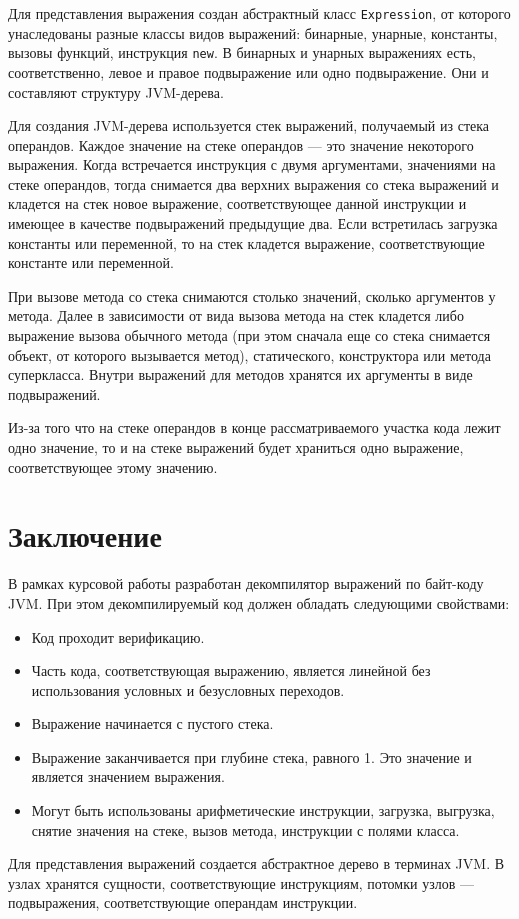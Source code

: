 Для представления выражения создан абстрактный класс \texttt{Expression}, от которого унаследованы разные классы видов выражений: бинарные, унарные, константы, вызовы функций, инструкция \texttt{new}. В бинарных и унарных выражениях есть, соответственно, левое и правое подвыражение или одно подвыражение. Они и составляют структуру JVM-дерева.

Для создания JVM-дерева используется стек выражений, получаемый из стека операндов. Каждое значение на стеке операндов --- это значение некоторого выражения. Когда встречается инструкция с двумя аргументами, значениями на стеке операндов, тогда снимается два верхних выражения со стека выражений и кладется на стек новое выражение, соответствующее данной инструкции и имеющее в качестве подвыражений предыдущие два. Если встретилась загрузка константы или переменной, то на стек кладется выражение, соответствующие константе или переменной. 

При вызове метода со стека снимаются столько значений, сколько аргументов у метода. Далее в зависимости от вида вызова метода на стек кладется либо выражение вызова обычного метода (при этом сначала еще со стека снимается объект, от которого вызывается метод), статического, конструктора или метода суперкласса. Внутри выражений для методов хранятся их аргументы в виде подвыражений.

Из-за того что на стеке операндов в конце рассматриваемого участка кода лежит одно значение, то и на стеке выражений будет храниться одно выражение, соответствующее этому значению.

\section*{Заключение}

В рамках курсовой работы разработан декомпилятор выражений по байт-коду JVM. При этом декомпилируемый код должен обладать следующими свойствами:
\begin{itemize}
\item Код проходит верификацию.
\item Часть кода, соответствующая выражению, является линейной без использования условных и безусловных переходов.
\item Выражение начинается с пустого стека.
\item Выражение заканчивается при глубине стека, равного 1. Это значение и является значением выражения.
\item Могут быть использованы арифметические инструкции, загрузка, выгрузка, снятие значения на стеке, вызов метода, инструкции с полями класса. 
\end{itemize}
Для представления выражений создается абстрактное дерево в терминах JVM. В узлах хранятся сущности, соответствующие инструкциям, потомки узлов --- подвыражения, соответствующие операндам инструкции.

